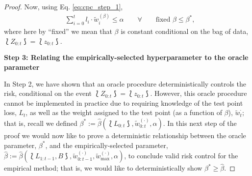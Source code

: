 \begin{proof}
Now, using Eq. \eqref{eq:cpc_step_1}, 
\begin{align}\label{eq:cpc_step_2}
    &\sum_{i=0}^{t}l_i\cdot \tilde{w}_i^{(\beta)}\leq \alpha \qquad \forall \qquad \text{fixed } \beta \leq \beta^*,
\end{align}
where here by ``fixed'' we mean that $\beta$ is constant conditional on the bag of data, $\lbag Z_{0:t} \rbag = \lbag z_{0:t} \rbag$.

\vspace{1cm}


\textbf{Step 3: Relating the empirically-selected hyperparameter to the oracle parameter}


In Step 2, we have shown that an oracle procedure deterministically controls the risk, conditional on the event $\lbag Z_{0:t} \rbag = \lbag z_{0:t} \rbag$. However, this oracle procedure cannot be implemented in practice due to requiring knowledge of the test point loss, $L_{t}$, as well as the weight assigned to the test point (as a function of $\beta$), $\tilde{w}_{t}^{\cdot}$; that is, recall we defined $\beta^* := \hat{\beta}(\lbag L_{0:t} \rbag, \tilde{w}_{0:t}^{(\cdot)},  \alpha)$. In this next step of the proof we would now like to prove a deterministic relationship between the oracle parameter, $\beta^*$, and the empirically-selected parameter, $\hat{\beta}:=\hat{\beta}(\lbag L_{1:t-1}, B \rbag, \tilde{w}_{0:t-1}^{(\cdot)}, \tilde{w}_{\max}^{(\cdot)},  \alpha)$, to conclude valid risk control for the empirical method; that is, we would like to deterministically show $\beta^* \geq \hat{\beta}$.



\end{proof}
